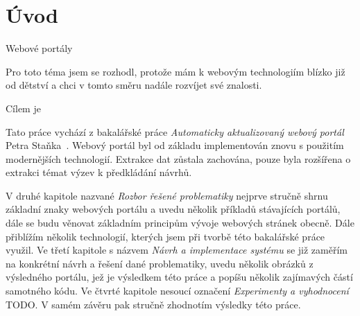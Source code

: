 \chapter{Úvod}
Webové portály \blindtext

Pro toto téma jsem se rozhodl, protože mám k webovým technologiím blízko již od dětství a chci v tomto směru nadále rozvíjet své znalosti.

Cílem je \blindtext

Tato práce vychází z bakalářské práce \emph{Automaticky aktualizovaný webový portál} Petra Staňka~\cite{bib:stanek}.
Webový portál byl od základu implementován znovu s použitím modernějších technologií. Extrakce dat zůstala zachována, pouze byla rozšířena o extrakci témat výzev k předkládání návrhů.

V druhé kapitole nazvané \emph{Rozbor řešené problematiky} nejprve stručně shrnu základní znaky webových portálu a uvedu několik příkladů stávajících portálů, dále se budu věnovat základním principům vývoje webových stránek obecně. Dále přiblížím několik technologií, kterých jsem při tvorbě této bakalářské práce využil.
Ve třetí kapitole s názvem \emph{Návrh a implementace systému} se již zaměřím na konkrétní návrh a řešení dané problematiky, uvedu několik obrázků z výsledného portálu, jež je výsledkem této práce a popíšu několik zajímavých částí samotného kódu.
Ve čtvrté kapitole nesoucí označení \emph{Experimenty a vyhodnocení} TODO. V samém závěru pak stručně zhodnotím výsledky této práce.